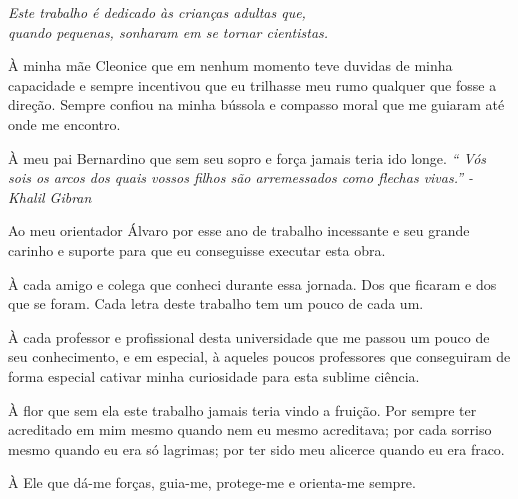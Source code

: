 \begin{dedicatoria}
   \vspace*{\fill}
   \centering
   \noindent
   \textit{ Este trabalho é dedicado às crianças adultas que,\\
   quando pequenas, sonharam em se tornar cientistas.} \vspace*{\fill}
\end{dedicatoria}


\begin{agradecimentos}

À minha mãe Cleonice que em nenhum momento teve duvidas de minha capacidade e sempre incentivou que eu trilhasse meu rumo qualquer que fosse a direção. Sempre confiou na minha bússola e compasso moral que me guiaram até onde me encontro.

À meu pai Bernardino que sem seu sopro e força jamais teria ido longe. \textit{`` Vós sois os arcos dos quais vossos filhos são arremessados como flechas vivas.'' - Khalil Gibran}

Ao meu orientador Álvaro por esse ano de trabalho incessante e seu grande carinho e suporte para que eu conseguisse executar esta obra.

À cada amigo e colega que conheci durante essa jornada. Dos que ficaram e dos que se foram. Cada letra deste trabalho tem um pouco de cada um.

À cada professor e profissional desta universidade que me passou um pouco de seu conhecimento, e em especial, à aqueles poucos professores que conseguiram  de forma especial cativar minha curiosidade para esta sublime ciência.

À flor que sem ela este trabalho jamais teria vindo a fruição. Por sempre ter acreditado em mim mesmo quando nem eu mesmo acreditava; por cada sorriso mesmo quando eu era só lagrimas; por ter sido meu alicerce quando eu era fraco.

À Ele que dá-me forças, guia-me, protege-me e orienta-me sempre.

\end{agradecimentos}


